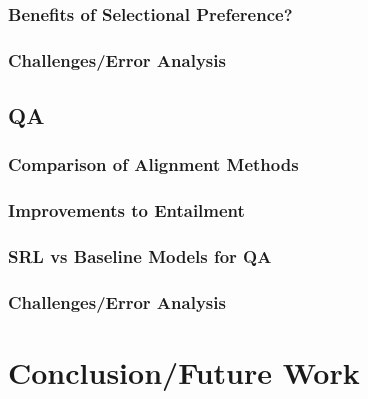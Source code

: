 \documentclass[11pt,a4paper]{article}
\begin{document}
		\subsubsection{Benefits of Selectional Preference?}
		\subsubsection{Challenges/Error Analysis}
	\subsection{QA}
		\subsubsection{Comparison of Alignment Methods}
		\subsubsection{Improvements to Entailment}
		\subsubsection{SRL vs Baseline Models for QA}
		\subsubsection{Challenges/Error Analysis}

\section{Conclusion/Future Work}
\end{document}
